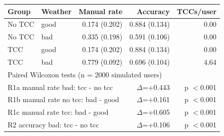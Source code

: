 \begin{tabular}{llrrr}
\toprule
Group & Weather & Manual rate & Accuracy & TCCs/user \\
\midrule
No TCC & good & 0.174 (0.202) & 0.884 (0.134) & 0.00 \\
No TCC & bad & 0.335 (0.198) & 0.591 (0.106) & 0.00 \\
TCC & good & 0.174 (0.202) & 0.884 (0.134) & 0.00 \\
TCC & bad & 0.779 (0.092) & 0.696 (0.104) & 4.64 \\
\midrule
\multicolumn{5}{l}{Paired Wilcoxon tests (n = 2000 simulated users)} \\
\multicolumn{3}{l}{R1a manual rate bad: tcc - no tcc} & $\Delta$=+0.443 & p $<$0.001 \\
\multicolumn{3}{l}{R1b manual rate no tcc: bad - good} & $\Delta$=+0.161 & p $<$0.001 \\
\multicolumn{3}{l}{R1c manual rate tcc: bad - good} & $\Delta$=+0.605 & p $<$0.001 \\
\multicolumn{3}{l}{R2 accuracy bad: tcc - no tcc} & $\Delta$=+0.106 & p $<$0.001 \\
\bottomrule
\end{tabular}